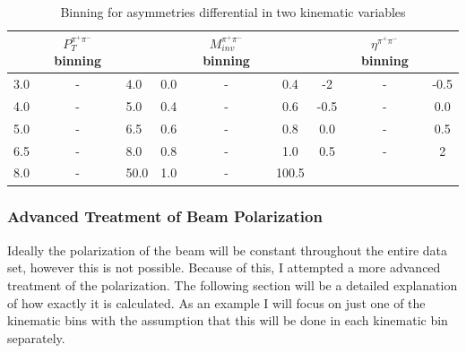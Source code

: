\documentclass[abstract = on,listof=totoc, bibliography=totoc]{scrreprt}
\newcommand{\ptpair}{P_{T}^{\pi^+\pi^-}}
\newcommand{\mpair}{M_{inv}^{\pi^+\pi^-}}
\newcommand{\etapair}{\eta^{\pi^+\pi^-}}
\begin{document}
\begin{center}
\begin{table}[h!]
\caption{Binning for asymmetries differential in two kinematic variables}
\begin{tabular}{r c l | c c c | c c c } 
\\
 & $\ptpair$ binning &  & & $\mpair$ binning & & & $\etapair$ binning &	\\ \hline
3.0 & - & 4.0 & 0.0 & - & 0.4 & -2 & - & -0.5 \\		
4.0 & - & 5.0 & 0.4 & - & 0.6 & -0.5 & - & 0.0 \\
5.0 & - & 6.5 &0.6 & - & 0.8 & 0.0 & - & 0.5 \\
6.5 & - & 8.0 & 0.8 & - & 1.0 & 0.5 & - & 2\\
8.0 & - & 50.0 & 1.0 & - & 100.5 &	\\
\end{tabular}
\label{tab:2dbinning}
\end{table}
\end{center}



\subsubsection{Advanced Treatment of Beam Polarization}

Ideally the polarization of the beam will be constant throughout the entire data set, however this is not possible. Because of this, I attempted a more advanced treatment of the polarization. The following section will be a detailed explanation of how exactly it is calculated. As an example I will focus on just one of the kinematic bins with the assumption that this will be done in each kinematic bin separately. 
\end{document}
